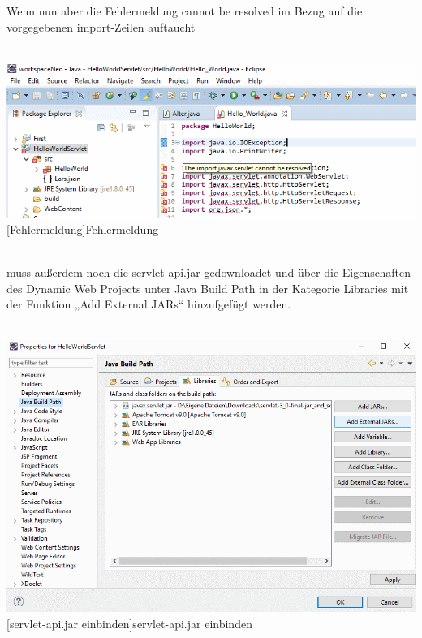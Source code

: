 \documentclass[12pt,a4paper,bibliography=totocnumbered,listof=totocnumbered]{scrartcl}
\begin{document}
Wenn nun aber die Fehlermeldung  \glqq cannot be resolved\grqq{} im Bezug auf die vorgegebenen import-Zeilen auftaucht \\
\\
\vspace{1em}
\begin{minipage}{\linewidth}
	\centering
	\includegraphics[width=0.9\linewidth]{Bilder/Eclipse-ServerErstellen3.png}
	[Fehlermeldung]{Fehlermeldung}	
	\label{fig:eclipse4}
\end{minipage}
\\

muss außerdem noch die servlet-api.jar gedownloadet und über die Eigenschaften des \glqq Dynamic Web Projects\grqq{} unter \glqq Java Build Path\grqq{} in der Kategorie \glqq Libraries\grqq{} mit der Funktion „Add External JARs“ hinzufgefügt werden.\\
\\
\vspace{1em}
\begin{minipage}{\linewidth}
	\centering
	\includegraphics[width=0.9\linewidth]{Bilder/Eclipse-ServerErstellen4.png}
	[servlet-api.jar einbinden]{servlet-api.jar einbinden}	
	\label{fig:eclipse5}
\end{minipage}
\\
 
\end{document}
